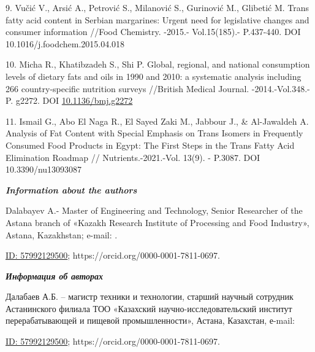 \begin{references}
9. Vučić V., Arsić A., Petrović S., Milanović S., Gurinović M., Glibetić
M. Trans fatty acid content in Serbian margarines: Urgent need for
legislative changes and consumer information //Food Chemistry. -2015.-
Vol.15(185).- P.437-440. DOI 10.1016/j.foodchem.2015.04.018

10. Micha R., Khatibzadeh S., Shi P. Global, regional, and national
consumption levels of dietary fats and oils in 1990 and 2010: a
systematic analysis including 266 country-specific nutrition surveys
//British Medical Journal. -2014.-Vol.348.-P. g2272. DOI
\href{https://doi.org/10.1136/bmj.g2272}{10.1136/bmj.g2272}

11. Ismail G., Abo El Naga R., El Sayed Zaki M., Jabbour J., \&
Al-Jawaldeh A. Analysis of Fat Content with Special Emphasis on Trans
Isomers in Frequently Consumed Food Products in Egypt: The First Steps
in the Trans Fatty Acid Elimination Roadmap // Nutrients.-2021.-Vol.
13(9). - P.3087. DOI 10.3390/nu13093087
\end{references}

\begin{authorinfo}
\emph{{\bfseries Information about the authors}}

Dalabayev A.- Master of Engineering and Technology, Senior Researcher of
the Astana branch of «Kazakh Research Institute of Processing and Food
Industry», Astana, Kazakhstan; e-mail:
\href{mailto:dalabaev_askhat@mail.ru}{}.

\href{http://www.scopus.com/inward/authorDetails.url?authorID=56576301100&partnerID=MN8TOARS}{ID:
57992129500}; https://orcid.org/0000-0001-7811-0697.

\emph{{\bfseries Информация об авторах}}

Далабаев А.Б. -- магистр техники и технологии, старший научный сотрудник
Астанинского филиала ТОО «Казахский научно-исследовательский институт
перерабатывающей и пищевой промышленности», Астана, Казахстан, е-mail:
\href{mailto:dalabaev_askhat@mail.ru}{}

\href{http://www.scopus.com/inward/authorDetails.url?authorID=56576301100&partnerID=MN8TOARS}{ID:
57992129500}; https://orcid.org/0000-0001-7811-0697.\
\end{authorinfo}
